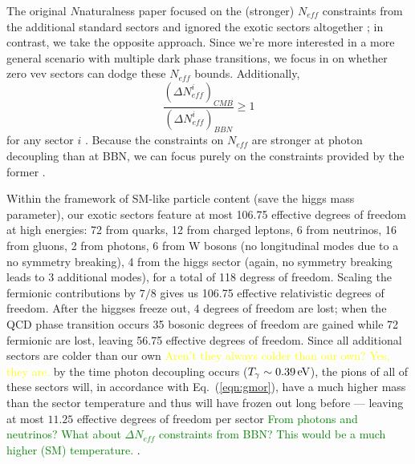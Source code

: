 \documentclass[nofootinbib,twocolumn,preprintnumbers]{revtex4-1}
\begin{document}
The original $N$naturalness paper focused on the (stronger) $N_{eff}$ constraints from the additional standard sectors and ignored the exotic sectors altogether \cite{Arkani-Hamed:2016rle}; in contrast, we take the opposite approach. Since we're more interested in a more general scenario with multiple dark phase transitions, we focus in on whether zero vev sectors can dodge these $N_{eff}$ bounds. Additionally, 
\begin{equation}
\frac{(\Delta N^i_{eff})_{CMB}}{(\Delta N^i_{eff})_{BBN}} \geq 1
\end{equation}
for any sector $i$ \cite{Arkani-Hamed:2016rle}. Because the constraints on $N_{eff}$ are stronger at photon decoupling than at BBN, we can focus purely on the constraints provided by the former \cite{Aghanim:2018eyx}.

Within the framework of SM-like particle content (save the higgs mass parameter), our exotic sectors feature at most 106.75 effective degrees of freedom at high energies: 72 from quarks,  12 from charged leptons, 6 from neutrinos, 16 from gluons, 2 from photons, 6 from W bosons (no longitudinal modes due to a no symmetry breaking), 4 from the higgs sector (again, no symmetry breaking leads to 3 additional modes), for a total of 118 degress of freedom. Scaling the fermionic contributions by $7/8$ gives us 106.75 effective relativistic degrees of freedom.  After the higgses freeze out, 4 degrees of freedom are lost; when the QCD phase transition occurs 35 bosonic degrees of freedom are gained while 72 fermionic are lost, leaving 56.75 effective degrees of freedom. Since all additional sectors are colder than our own \textcolor{yellow}{Aren't they always colder than our own? Yes, they are.} by the time photon decoupling occurs ($T_\gamma \sim 0.39 \,{\rm eV}$), the pions of all of these sectors will, in accordance with Eq.~(\ref{eqn:gmor}), have a much higher mass than the sector temperature and thus will have frozen out long before --- leaving at most $11.25$ effective degrees of freedom per sector \textcolor{green}{From photons and neutrinos? What about $\Delta N_{eff}$ constraints from BBN? This would be a much higher (SM) temperature.} .
\end{document}
